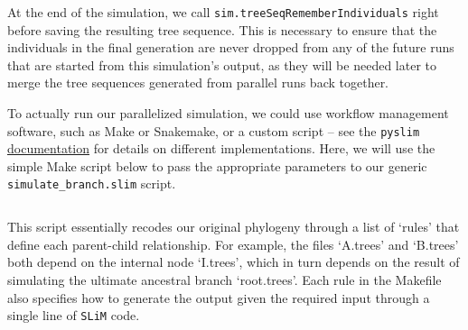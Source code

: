 \documentclass[12pt]{article}
\newcommand{\slim}[0]{\texttt{SLiM}\xspace}
\newcommand{\pyslim}[0]{\texttt{pyslim}\xspace}
\begin{document}

At the end of the simulation, we call \verb|sim.treeSeqRememberIndividuals| right before saving the resulting tree sequence.
This is necessary to ensure that the individuals in the final generation are never dropped from any of the future runs that are started from this simulation's output,
as they will be needed later to merge the tree sequences generated from parallel runs back together.

To actually run our parallelized simulation, we could use workflow management software, such as Make or Snakemake, or a custom script -- see the \pyslim
\href{https://tskit.dev/pyslim/docs/latest/vignette_parallel_phylo.html}{documentation} for details on different implementations. Here, we will use the simple Make script below to pass
the appropriate parameters to our generic \verb|simulate_branch.slim| script.
%
\inputminted[breaklines,fontsize=\small, breakanywhere=true, breakautoindent=true, linenos, bgcolor=gray!10]{basemake}{code/parallelizing_multiple_species/parallel_sims.make}
%
This script essentially recodes our original phylogeny through a list of `rules' that define each parent-child relationship.
For example, the files `A.trees' and `B.trees' both depend on the internal node `I.trees',
which in turn depends on the result of simulating the ultimate ancestral branch `root.trees'.
Each rule in the Makefile also specifies how to generate the output given the required input through a single line of \slim code.
\end{document}
